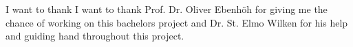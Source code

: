I want to thank I want to thank Prof. Dr. Oliver Ebenhöh for giving me the chance of working on this bachelors project and Dr. St. Elmo Wilken for his help and guiding hand throughout this project.
